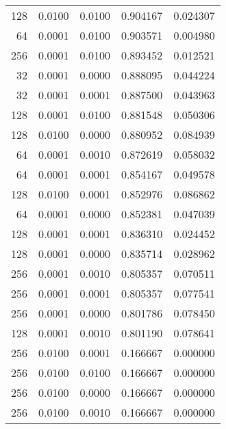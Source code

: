 \begin{tabular}{rrrrr}
 128 &  0.0100 &  0.0100 &  0.904167 &  0.024307 \\
  64 &  0.0001 &  0.0100 &  0.903571 &  0.004980 \\
 256 &  0.0001 &  0.0100 &  0.893452 &  0.012521 \\
  32 &  0.0001 &  0.0000 &  0.888095 &  0.044224 \\
  32 &  0.0001 &  0.0001 &  0.887500 &  0.043963 \\
 128 &  0.0001 &  0.0100 &  0.881548 &  0.050306 \\
 128 &  0.0100 &  0.0000 &  0.880952 &  0.084939 \\
  64 &  0.0001 &  0.0010 &  0.872619 &  0.058032 \\
  64 &  0.0001 &  0.0001 &  0.854167 &  0.049578 \\
 128 &  0.0100 &  0.0001 &  0.852976 &  0.086862 \\
  64 &  0.0001 &  0.0000 &  0.852381 &  0.047039 \\
 128 &  0.0001 &  0.0001 &  0.836310 &  0.024452 \\
 128 &  0.0001 &  0.0000 &  0.835714 &  0.028962 \\
 256 &  0.0001 &  0.0010 &  0.805357 &  0.070511 \\
 256 &  0.0001 &  0.0001 &  0.805357 &  0.077541 \\
 256 &  0.0001 &  0.0000 &  0.801786 &  0.078450 \\
 128 &  0.0001 &  0.0010 &  0.801190 &  0.078641 \\
 256 &  0.0100 &  0.0001 &  0.166667 &  0.000000 \\
 256 &  0.0100 &  0.0100 &  0.166667 &  0.000000 \\
 256 &  0.0100 &  0.0000 &  0.166667 &  0.000000 \\
 256 &  0.0100 &  0.0010 &  0.166667 &  0.000000 \\
\bottomrule
\end{tabular}
